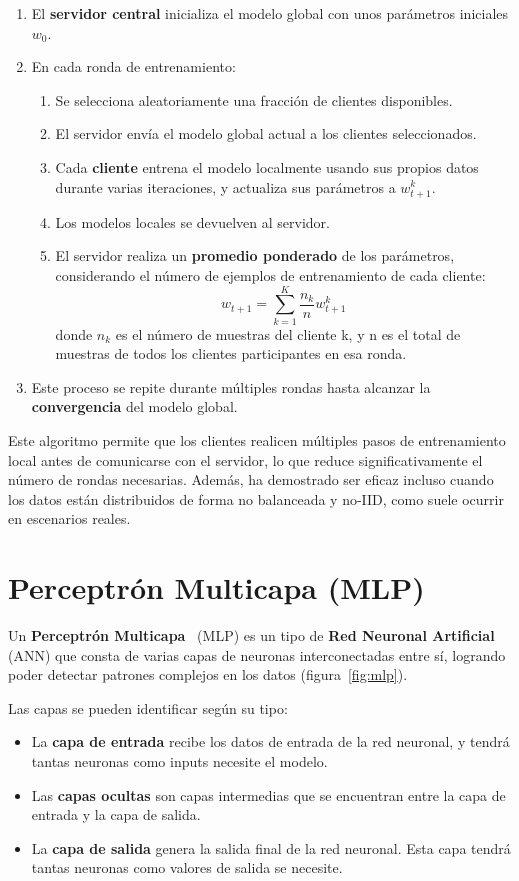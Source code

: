\begin{enumerate}
    \item El \textbf{servidor central} inicializa el modelo global con unos parámetros iniciales \(w_0\).
    \item En cada ronda de entrenamiento:
    \begin{enumerate}
        \item Se selecciona aleatoriamente una fracción de clientes disponibles.
        \item El servidor envía el modelo global actual a los clientes seleccionados.
        \item Cada \textbf{cliente} entrena el modelo localmente usando sus propios datos durante varias iteraciones, y actualiza sus parámetros a 
        \(w_{t+1}^k\).
        \item Los modelos locales se devuelven al servidor.
        \item El servidor realiza un \textbf{promedio ponderado} de los parámetros, considerando el número de ejemplos de entrenamiento de cada cliente: \[w_{t+1} = \sum_{k = 1}^{K} \frac{n_k}{n} w_{t+1}^k\] donde \(n_k\) es el número de muestras del cliente k, y n es el total de muestras de todos los clientes participantes en esa ronda.
    \end{enumerate}
    \item Este proceso se repite durante múltiples rondas hasta alcanzar la \textbf{convergencia} del modelo global.
\end{enumerate}

Este algoritmo permite que los clientes realicen múltiples pasos de entrenamiento local antes de comunicarse con el servidor, lo que reduce significativamente el número de rondas necesarias. Además, ha demostrado ser eficaz incluso cuando los datos están distribuidos de forma no balanceada y no-IID, como suele ocurrir en escenarios reales.

\section{Perceptrón Multicapa (MLP)}
\label{sec:MLP}
Un \textbf{Perceptrón Multicapa}~\cite{perceptron_multicapa} (MLP) es un tipo de \textbf{Red Neuronal Artificial} (ANN) que consta de varias capas de neuronas interconectadas entre sí, logrando poder detectar patrones complejos en los datos (figura~\ref{fig:mlp}).

Las capas se pueden identificar según su tipo:
\begin{itemize}
    \item La \textbf{capa de entrada} recibe los datos de entrada de la red neuronal, y tendrá tantas neuronas como inputs necesite el modelo.
    \item  Las \textbf{capas ocultas} son capas intermedias que se encuentran entre la capa de entrada y la capa de salida.
    \item La \textbf{capa de salida} genera la salida final de la red neuronal. Esta capa tendrá tantas neuronas como valores de salida se necesite.
\end{itemize}

